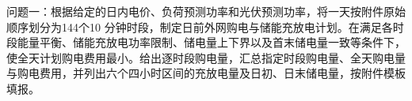 问题一：根据给定的日内电价、负荷预测功率和光伏预测功率，将一天按附件原始顺序划分为144个10 分钟时段，制定日前外网购电与储能充放电计划。在满足各时段能量平衡、储能充放电功率限制、储电量上下界以及首末储电量一致等条件下，使全天计划购电费用最小。给出逐时段购电量，汇总指定时段购电量、全天购电量与购电费用，并列出六个四小时区间的充放电量及日初、日末储电量，按附件模板填报。
